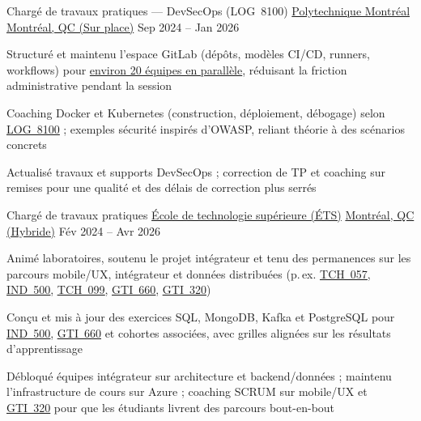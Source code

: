 \begin{cventries}
\cventry
{Chargé de travaux pratiques --- DevSecOps (LOG~8100)} %
{\href{https://www.polymtl.ca/}{Polytechnique Montréal}} %
{\href{https://www.google.com/maps/search/?api=1\&query=Montreal,+QC,+Canada}{Montréal, QC (Sur place)}} %
{Sep 2024 -- Jan 2026} %
{
\begin{cvitems}
\item {Structuré et maintenu l'espace GitLab (dépôts, modèles CI/CD, runners, workflows) pour \uline{environ 20 équipes en parallèle}, réduisant la friction administrative pendant la session}
\item {Coaching Docker et Kubernetes (construction, déploiement, débogage) selon \href{https://www.polymtl.ca/programmes/cours/devsecops-operations-et-dev-logiciel-secur}{\uline{LOG~8100}} ; exemples sécurité inspirés d'OWASP, reliant théorie à des scénarios concrets}
\item {Actualisé travaux et supports DevSecOps ; correction de TP et coaching sur remises pour une qualité et des délais de correction plus serrés}
\end{cvitems}
}

\cventry
{Chargé de travaux pratiques} %
{\href{https://www.etsmtl.ca/}{École de technologie supérieure (ÉTS)}} %
{\href{https://www.google.com/maps/search/?api=1\&query=Montreal,+QC,+Canada}{Montréal, QC (Hybride)}} %
{Fév 2024 -- Avr 2026} %
{
\begin{cvitems}
\item {Animé laboratoires, soutenu le projet intégrateur et tenu des permanences sur les parcours mobile/UX, intégrateur et données distribuées (p.\,ex. \href{https://www.etsmtl.ca/etudes/cours/tch057}{\uline{TCH~057}}, \href{https://www.etsmtl.ca/etudes/cours/ind500}{\uline{IND\ 500}}, \href{https://www.etsmtl.ca/etudes/cours/tch099}{\uline{TCH~099}}, \href{https://www.etsmtl.ca/etudes/cours/gti660}{\uline{GTI~660}}, \href{https://www.etsmtl.ca/etudes/cours/gti320}{\uline{GTI~320}})}
\item {Conçu et mis à jour des exercices SQL, MongoDB, Kafka et PostgreSQL pour \href{https://www.etsmtl.ca/etudes/cours/ind500}{\uline{IND\ 500}}, \href{https://www.etsmtl.ca/etudes/cours/gti660}{\uline{GTI~660}} et cohortes associées, avec grilles alignées sur les résultats d'apprentissage}
\item {Débloqué équipes intégrateur sur architecture et backend/données ; maintenu l'infrastructure de cours sur Azure ; coaching SCRUM sur mobile/UX et \href{https://www.etsmtl.ca/etudes/cours/gti320}{\uline{GTI~320}} pour que les étudiants livrent des parcours bout-en-bout}
\end{cvitems}
}


\end{cventries}
